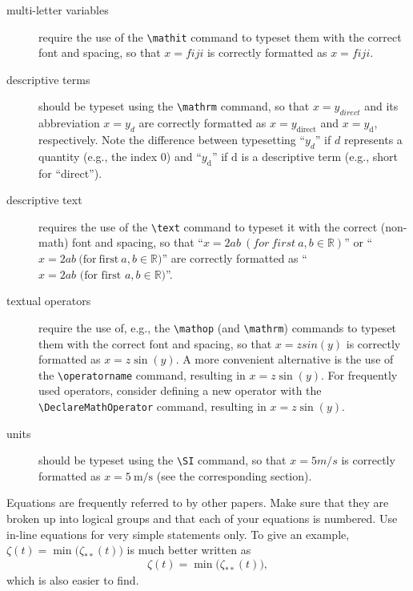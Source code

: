 \begin{description}
\item[multi-letter variables] require the use of the \verb|\mathit| command to typeset them with the correct font and spacing, so that $x = fiji$ is correctly formatted as $x = \mathit{fiji}$.

\item[descriptive terms] should be typeset using the \verb|\mathrm| command, so that $x = y_{direct}$ and its abbreviation $x = y_d$ are correctly formatted as $x = y_{\mathrm{direct}}$ and $x = y_\mathrm{d}$, respectively.
Note the difference between typesetting \enquote{$y_d$} if $d$ represents a quantity (e.g., the index 0) and \enquote{$y_\mathrm{d}$} if $\mathrm{d}$ is a descriptive term (e.g., short for \enquote{direct}).

\item[descriptive text] requires the use of the \verb|\text| command to typeset it with the correct (non-math) font and spacing, so that \enquote{$x = 2ab\ (for\ first\ a,b \in \mathbb{R})$} or \enquote{$x = 2ab \mathrm{\  (for\ first\ } a,b \in \mathbb{R} \mathrm{)}$} are correctly formatted as \enquote{$x = 2ab \text{ (for first } a,b \in \mathbb{R} \text{)}$}.

\item[textual operators] require the use of, e.g., the \verb|\mathop| (and \verb|\mathrm|) commands to typeset them with the correct font and spacing, so that $x = z sin(y)$ is correctly formatted as $x = z\mathop{\mathrm{sin}}(y)$.
A more convenient alternative is the use of the \verb|\operatorname| command, resulting in $x = z\operatorname{sin}(y)$.
For frequently used operators, consider defining a new operator with the \verb|\DeclareMathOperator| command, resulting in $x = z\sin(y)$.

\item[units] should be typeset using the \verb|\SI| command, so that $x = 5m/s$ is correctly formatted as $x = \SI{5}{\meter\per\second}$ (see the corresponding section).

\end{description}

Equations are frequently referred to by other papers.
Make sure that they are broken up into logical groups and that each of your equations is numbered.
Use in-line equations for very simple statements only.
To give an example, $\zeta(t) = \min\bigl( \zeta_{**} \left( t \right) \bigr)$ is much better written as
\begin{equation}\label{eq:zeta}
\zeta(t) = \min\bigl( \zeta_{**} \left( t \right) \bigr)
,
\end{equation}
which is also easier to find.


